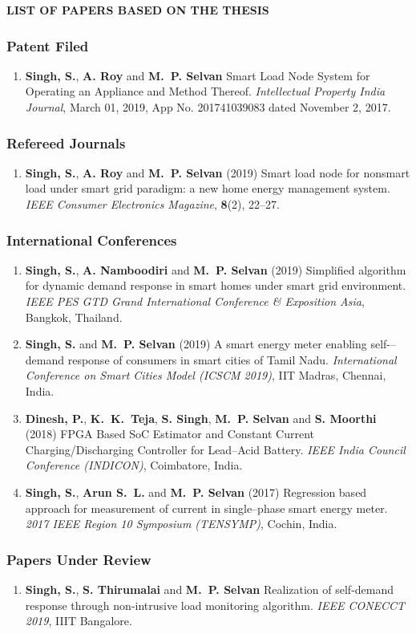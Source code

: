 {}
\newpage
\centerline{\normalsize\textbf{LIST OF PAPERS BASED ON THE THESIS}}%
\vspace{0cm}
\smallskip
\subsubsection*{Patent Filed}
\begin{enumerate}
\item \textbf{Singh, S.}, \textbf{A. Roy} and \textbf{M.~P. Selvan} Smart Load Node System for Operating an Appliance and Method Thereof. \textit{Intellectual Property India Journal}, March 01, 2019, App No. 201741039083 dated November 2, 2017.    
\end{enumerate}
\subsubsection*{Refereed Journals}
\begin{enumerate}
\item \textbf{Singh, S.}, \textbf{A. Roy} and \textbf{M.~P. Selvan} (2019) Smart load node for nonsmart load under smart grid paradigm: a new home energy management system. \textit{IEEE Consumer Electronics Magazine}, \textbf{8}(2), 22--27.
\end{enumerate}
\subsubsection*{International Conferences}
\begin{enumerate}
\item \textbf{Singh, S.}, \textbf{A. Namboodiri} and \textbf{M.~P. Selvan} (2019) Simplified algorithm for dynamic demand response in smart homes under smart grid environment. \textit{IEEE PES GTD Grand International Conference \& Exposition Asia}, Bangkok, Thailand.
\item \textbf{Singh, S.} and  \textbf{M.~P. Selvan} (2019) A smart energy meter enabling self-–demand response of consumers in smart cities of Tamil Nadu. \textit{International Conference on Smart Cities Model (ICSCM 2019)}, IIT Madras, Chennai, India.
\item  \textbf{Dinesh, P.}, \textbf{K.~K.~Teja}, \textbf{S. Singh}, \textbf{M.~P. Selvan} and \textbf{S. Moorthi} (2018) FPGA Based SoC Estimator and Constant Current Charging/Discharging Controller for Lead--Acid Battery. \textit{IEEE India Council Conference (INDICON)}, Coimbatore, India.
\item \textbf{Singh, S.}, \textbf{Arun S.~L.} and \textbf{M.~P. Selvan} (2017) Regression based approach for measurement of current in single--phase smart energy meter. \textit{2017 IEEE Region 10 Symposium (TENSYMP)}, Cochin, India.
\end{enumerate}
\subsubsection*{Papers Under Review}
\begin{enumerate}
\item \textbf{Singh, S.}, \textbf{S. Thirumalai} and \textbf{M.~P. Selvan} Realization of self-demand response through non-intrusive load monitoring algorithm. \textit{IEEE CONECCT 2019}, IIIT Bangalore.
\end{enumerate}